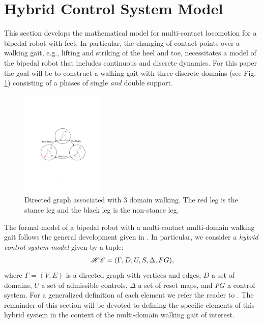 \section{Hybrid Control System Model}
\label{sec:hybridsystems}

This section develops the mathematical model for multi-contact locomotion for a bipedal robot with feet.  In particular, the changing of contact points over a walking gait, e.g., lifting and striking of the heel and toe, necessitates a model of the bipedal robot that includes continuous and discrete dynamics.  For this paper the goal will be to construct a walking gait with three discrete domains (see Fig. \ref{fig:DomainGraph}) consisting of a phases of single \emph{and} double support.

\begin{figure}[t]
\centering
\includegraphics[width=0.35\textwidth]{figures/DomainGraph.pdf}
\caption{Directed graph associated with 3 domain walking. The red leg is the stance leg and the black leg is the non-stance leg.}
\label{fig:DomainGraph}
\end{figure}

The formal model of a bipedal robot with a multi-contact multi-domain walking gait follows the general development given in \cite{SPSA:IFAC:11}.  In particular, we consider a {\it hybrid control system model} given by a tuple:
 \begin{align}
 \label{eqn:HC}
  \mathscr{HC} = (\Gamma, D, U, S, \Delta, FG),
 \end{align}
 where $\Gamma = (V,E)$ is a directed graph with vertices and edges,
  $D$ a set of domains, $U$ a set of admissible controls, $\Delta$ a set of reset maps, and $FG$ a control system. For a generalized definition of each element we refer the reader to \cite{SPSA:IFAC:11}.
The remainder of this section will be devoted to defining the specific elements of this hybrid system in the context of the multi-domain walking gait of interest. 

